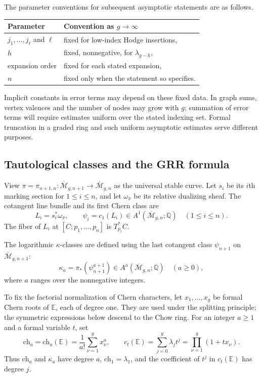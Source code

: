 \documentclass[a4paper,10pt]{article}
\numberwithin{equation}{section}
\newcommand{\MM}{\overline{\mathcal{M}}}
\newcommand{\EE}{\mathbb{E}}
\theoremstyle{paperplain}
\theoremstyle{paperremark}
\theoremstyle{paperplain}
\begin{document}
The parameter conventions for subsequent asymptotic statements are as
follows.
\begin{center}
\begin{tabular}{ll}
Parameter & Convention as $g\to\infty$ \\
\hline
$j_1,\ldots,j_\ell$ and $\ell$ & fixed for low-index Hodge insertions, \\
$h$ & fixed, nonnegative, for $\lambda_{g-h}$, \\
expansion order & fixed for each stated expansion, \\
$n$ & fixed only when the statement so specifies.
\end{tabular}
\end{center}
Implicit constants in error terms may depend on these fixed data.
In graph sums, vertex valences and the number of nodes may grow with
$g$; summation of error terms will require estimates uniform over the
stated indexing set.  Formal truncation in a graded ring and such
uniform asymptotic estimates serve different purposes.

\subsection{Tautological classes and the GRR formula}
\label{subsec:s02:02}

View $\pi=\pi_{n+1,n}:\MM_{g,n+1}\to\MM_{g,n}$ as the universal
stable curve.  Let $s_i$ be its $i$th marking section for
$1\leq i\leq n$, and let $\omega_\pi$ be its relative dualizing
sheaf.  The cotangent line
bundle and its first Chern class are
\begin{equation}
\label{eq:s02:psi-definition}
L_i=s_i^*\omega_\pi,
\qquad
\psi_i=c_1(L_i)\in A^1(\MM_{g,n};\mathbb Q)
\quad(1\leq i\leq n).
\end{equation}
The fiber of $L_i$ at $[C;p_1,\ldots,p_n]$ is $T_{p_i}^*C$.

The logarithmic $\kappa$-classes are defined using the last cotangent
class $\psi_{n+1}$ on $\MM_{g,n+1}$:
\begin{equation}
\label{eq:s02:kappa-definition}
\kappa_a=\pi_*(\psi_{n+1}^{a+1})
\in A^a(\MM_{g,n};\mathbb Q)
\quad(a\geq0),
\end{equation}
where $a$ ranges over the nonnegative integers.

To fix the factorial normalization of Chern characters, let
$x_1,\ldots,x_g$ be formal Chern roots of $\EE$, each of degree one.
They are used under the splitting principle; the symmetric expressions
below descend to the Chow ring.  For an integer $a\geq1$ and a formal
variable $t$, set
\begin{equation}
\label{eq:s02:chern-definitions}
\mathrm{ch}_a=\mathrm{ch}_a(\EE)
=\frac{1}{a!}\sum_{\nu=1}^g x_\nu^a,
\qquad
c_t(\EE)=\sum_{j=0}^g\lambda_jt^j
=\prod_{\nu=1}^g(1+tx_\nu).
\end{equation}
Thus $\mathrm{ch}_a$ and $\kappa_a$ have degree $a$,
$\mathrm{ch}_1=\lambda_1$, and the coefficient of $t^j$ in
$c_t(\EE)$ has degree $j$.
\end{document}

